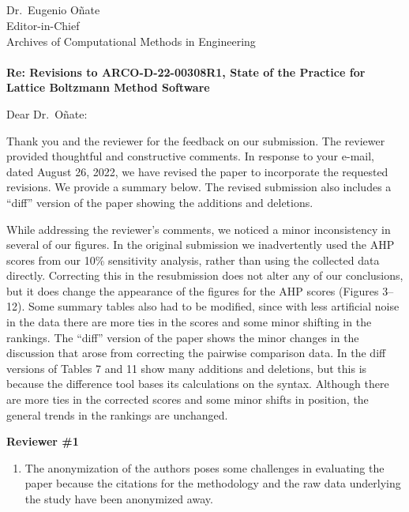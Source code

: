 \documentclass[12pt]{casletter}
\begin{document}
\begin{letter}{~\\
    ~\\
    ~\\
    ~\\
    Dr.\ Eugenio O\~{n}ate\\
    Editor-in-Chief\\
    Archives of Computational Methods in Engineering\\
    ~\\
    {\bf Re: Revisions to ARCO-D-22-00308R1, State of the Practice for Lattice
    Boltzmann Method Software}}

  \opening {Dear Dr.\ O\~{n}ate:}

  Thank you and the reviewer for the feedback on our submission.  The reviewer
  provided thoughtful and constructive comments.  In response to your e-mail,
  dated August 26, 2022, we have revised the paper to incorporate the requested
  revisions.  We provide a summary below.  The revised submission also includes
  a ``diff'' version of the paper showing the additions and deletions.

  While addressing the reviewer's comments, we noticed a minor inconsistency in
  several of our figures.  In the original submission we inadvertently used the
  AHP scores from our 10\% sensitivity analysis, rather than using the collected
  data directly. Correcting this in the resubmission does not alter any of our
  conclusions, but it does change the appearance of the figures for the AHP
  scores (Figures 3--12). Some summary tables also had to be modified, since
  with less artificial noise in the data there are more ties in the scores and
  some minor shifting in the rankings.  The ``diff'' version of the paper shows
  the minor changes in the discussion that arose from correcting the pairwise
  comparison data.  In the diff versions of Tables 7 and 11 show many additions
  and deletions, but this is because the difference tool bases its calculations
  on the syntax.  Although there are more ties in the corrected scores and some
  minor shifts in position, the general trends in the rankings are unchanged.  

  \textbf{Reviewer \#1}

  \begin{enumerate}
  \item The anonymization of the authors poses some challenges in evaluating
  the paper because the citations for the methodology and the raw data
  underlying the study have been anonymized away. \medskip


\end{enumerate}
\end{letter}
\end{document}

